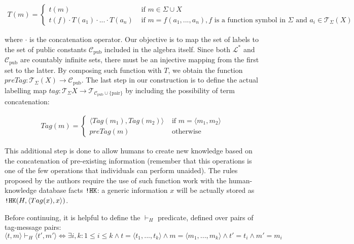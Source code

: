 \documentclass{article}
\newcommand{\mono}[1]{\textrm{\tt #1}}
\begin{document}
\begin{align*}
    T(m) =
    \begin{cases}
        t(m) & \textrm{ if } m \in \Sigma \cup X \\
        t(f) \cdot T(a_1) \cdot ... \cdot T(a_n) & \textrm{ if } m = f(a_1, ..., a_n), f \textrm{ is a function symbol in } \Sigma \textrm{ and } a_i \in \mathcal{T}_{\Sigma}(X)
    \end{cases}
\end{align*}

where $\cdot$ is the concatenation operator. Our objective is to map the set of labels to the set of public constants $\mathcal{C}_\textrm{pub}$ included in the algebra itself. Since both $\mathcal{L^*}$ and $\mathcal{C}_\textrm{pub}$ are countably infinite sets, there must be an injective mapping from the first set to the latter. By composing such function with $T$, we obtain the function $preTag : \mathcal{T}_\Sigma(X) \to \mathcal{C}_\textrm{pub}$. The last step in our construction is to define the actual labelling map $tag : \mathcal{T}_\Sigma{X} \to \mathcal{T}_{\mathcal{C}_\textrm{pub} \cup \{\textrm{pair}\} }$ by including the possibility of term concatenation:

\begin{align*}
    Tag(m) =
    \begin{cases}
        \langle Tag(m_1), Tag(m_2) \rangle & \textrm{ if } m = \langle m_1, m_2 \rangle \\
        preTag(m) & \textrm{ otherwise }
    \end{cases}
\end{align*}

This additional step is done to allow humans to create new knowledge based on the concatenation of pre-existing information (remember that this operations is one of the few operations that individuals can perform unaided). The rules proposed by the authors require the use of such function work with the human-knowledge database facts $\mono{!HK}$: a generic information $x$ will be actually stored as $\mono{!HK}(H, \langle Tag(x), x \rangle)$.

Before continuing, it is helpful to define the $\vdash_H$ predicate, defined over pairs of tag-message pairs:
\begin{equation*}
    \langle t, m \rangle \vdash_H \langle t', m' \rangle \iff \exists i, k : 1 \leq i \leq k \land t = \langle t_1, ..., t_k \rangle \land m = \langle m_1, ..., m_k \rangle \land t' = t_i \land m' = m_i
\end{equation*}
\end{document}
